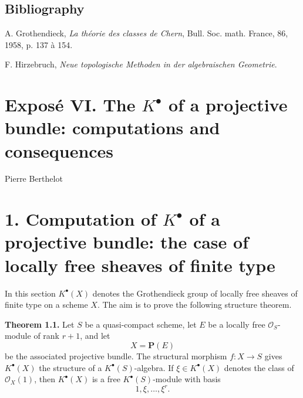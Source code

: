 \documentclass[11pt]{article}
\newcommand{\Spec}{\operatorname{Spec}}
\begin{document}
\subsection*{Bibliography}
\begin{enumerate}[label={[\arabic*]}]
\item A. Grothendieck, \emph{La théorie des classes de Chern}, Bull. Soc. math. France, 86, 1958, p. 137 à 154.
\item F. Hirzebruch, \emph{Neue topologische Methoden in der algebraischen Geometrie}.
\end{enumerate}



\providecommand{\Sym}{\operatorname{Sym}}
\providecommand{\Proj}{\operatorname{Proj}}
\providecommand{\Projz}{\operatorname{Proj}_0}
\providecommand{\Spec}{\operatorname{Spec}}
\providecommand{\Comp}{\operatorname{Comp}}
\providecommand{\Dplus}{D_{+}}
\providecommand{\id}{\operatorname{id}}
\providecommand{\cG}{\mathcal G}
\providecommand{\cA}{\mathcal A}
\providecommand{\cB}{\mathcal B}
\providecommand{\cL}{\mathscr L}
\providecommand{\cM}{\mathscr M}
\providecommand{\cN}{\mathscr N}
\providecommand{\cE}{\mathscr E}
\providecommand{\cK}{\mathscr K}
\providecommand{\cP}{\mathscr P}
\providecommand{\cQ}{\mathscr Q}
\providecommand{\OO}{\mathcal O}
\providecommand{\rk}{\operatorname{rk}}
\providecommand{\colim}{\operatorname*{colim}}


\section*{Exposé VI. The \(K^\bullet\) of a projective bundle: computations and consequences}
\begin{center}
Pierre Berthelot
\end{center}

\section*{1. Computation of \(K^\bullet\) of a projective bundle: the case of locally free sheaves of finite type}

In this section \(K^\bullet(X)\) denotes the Grothendieck group of locally free sheaves of finite type on a scheme \(X\). The aim is to prove the following structure theorem.

\textbf{Theorem 1.1.} Let \(S\) be a quasi-compact scheme, let \(E\) be a locally free \(\mathcal O_S\)-module of rank \(r+1\), and let
\[
  X=\mathbf P(E)
\]
be the associated projective bundle. The structural morphism \(f:X\to S\) gives \(K^\bullet(X)\) the structure of a \(K^\bullet(S)\)-algebra. If \(\xi\in K^\bullet(X)\) denotes the class of \(\mathcal O_X(1)\), then \(K^\bullet(X)\) is a free \(K^\bullet(S)\)-module with basis
\[
  1,\xi,\ldots,\xi^r .
\]
\end{document}
